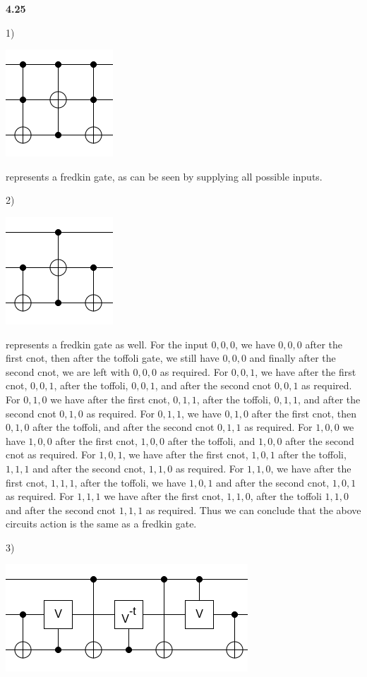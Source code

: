 \textbf{4.25}

1)

\includegraphics[scale=0.5]{images/4.25.png}

represents a fredkin gate, as can be seen by supplying all possible inputs. 

2) 

\includegraphics[scale = 0.5]{images/4.25.1.png}

represents a fredkin gate as well. For the input $0,0,0$, we have $0,0,0$ after the first cnot, then after the toffoli gate, we still have $0,0,0$ and finally after the second cnot, we are left with $0,0,0$ as required. For $0,0, 1$, we have after the first cnot, $0,0,1$, after the toffoli, $0,0,1$, and after the second cnot $0,0,1$ as required. For $0,1,0$ we have after the first cnot, $ 0,1,1$, after the toffoli, $0,1,1$, and after the second cnot $0,1,0$ as required. For $0,1,1$, we have $0,1,0$ after the first cnot, then $0,1,0$ after the toffoli, and after the second cnot $0,1,1$ as required. For $1,0,0$ we have $1,0,0$ after the first cnot, $1,0,0$ after the toffoli, and $ 1,0,0$ after the second cnot as required. For $1,0,1$, we have after the first cnot, $1,0,1$ after the toffoli, $ 1,1,1$ and after the second cnot, $1,1,0$ as required. For $ 1,1,0$, we have after the first cnot, $ 1,1,1$, after the toffoli, we have $ 1,0,1$ and after the second cnot, $1,0,1$ as required. For $1,1,1$ we have after the first cnot, $1,1,0$, after the toffoli $1,1,0$ and after the second cnot $ 1,1,1$ as required. Thus we can conclude that the above circuits action is the same as a fredkin gate.

3)

\includegraphics[scale = 0.5]{images/4.25.2.png}

